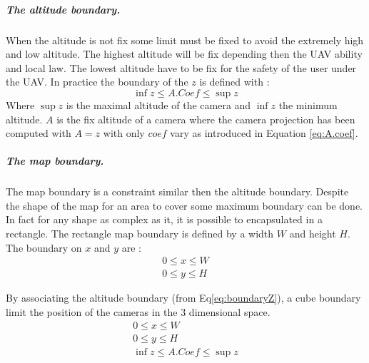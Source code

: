 \subparagraph{The altitude boundary.}\label{sec:altitudeBoundary}
 When the altitude is not fix  some limit must be fixed to avoid the extremely high and low altitude. The highest altitude will be fix depending then the UAV ability and local law. The lowest altitude have to be fix for the safety of the user under the UAV.  
In practice the boundary of the $z$ is defined with :
 \begin{equation}\label{eq:boundaryZ}
   \inf z\leq A.Coef\leq \sup z  
 \end{equation} 
 Where $\sup z$ is the maximal altitude of the camera and $\inf z$ the minimum altitude. $A$ is the fix altitude  of a camera where the camera projection has been computed with $A=z$ with only $coef$  vary as introduced in Equation \ref{eq:A.coef}. \\ 
 
 \subparagraph{The map boundary.}
 The map boundary is a constraint similar then the altitude boundary. Despite the shape of the map for an area to cover some maximum boundary can be done. In fact for any shape as complex as it, it is  possible to  encapsulated in a rectangle. The rectangle map boundary is defined by a width $W$ and height $H$. The boundary on $x$ and $y$ are :
 \begin{equation}
  \begin{array}{lcl}
  	0\leq x\leq W \\ 0\leq y\leq H 
  \end{array} 
 \end{equation}  
 
By associating the altitude boundary (from Eq\ref{eq:boundaryZ}), a cube boundary limit the position of the cameras in the 3 dimensional space. 
\begin{equation}\label{eq:3dBoundary}
  \begin{array}{lclcl}
  	0\leq x\leq W \\ 0\leq y\leq H  \\ \inf z\leq A.Coef\leq \sup z  
  \end{array} 
 \end{equation} 
 
